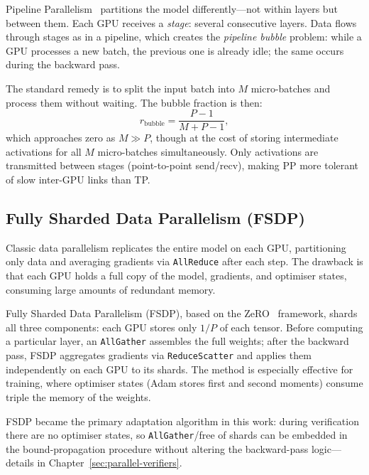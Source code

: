 Pipeline Parallelism~\cite{GPipePaper} partitions the model differently---not
within layers but between them. Each GPU receives a \textit{stage}: several
consecutive layers. Data flows through stages as in a pipeline, which creates
the \textit{pipeline bubble} problem: while a GPU processes a new batch, the
previous one is already idle; the same occurs during the backward pass.

The standard remedy is to split the input batch into $M$ micro-batches and
process them without waiting. The bubble fraction is then:
$$r_{\text{bubble}} = \frac{P - 1}{M + P - 1},$$
which approaches zero as $M \gg P$, though at the cost of storing intermediate
activations for all $M$ micro-batches simultaneously. Only activations are
transmitted between stages (point-to-point send/recv), making PP more tolerant
of slow inter-GPU links than TP.

\subsection{Fully Sharded Data Parallelism (FSDP)}

Classic data parallelism replicates the entire model on each GPU, partitioning
only data and averaging gradients via \texttt{AllReduce} after each step.
The drawback is that each GPU holds a full copy of the model, gradients, and
optimiser states, consuming large amounts of redundant memory.

Fully Sharded Data Parallelism (FSDP), based on the ZeRO~\cite{ZeROPaper}
framework, shards all three components: each GPU stores only $1/P$ of each
tensor. Before computing a particular layer, an \texttt{AllGather} assembles
the full weights; after the backward pass, FSDP aggregates gradients via
\texttt{ReduceScatter} and applies them independently on each GPU to its shards.
The method is especially effective for training, where optimiser states
(Adam stores first and second moments) consume triple the memory of the weights.

FSDP became the primary adaptation algorithm in this work: during verification
there are no optimiser states, so \texttt{AllGather}/free of shards can be
embedded in the bound-propagation procedure without altering the backward-pass
logic---details in Chapter~\ref{sec:parallel-verifiers}.
